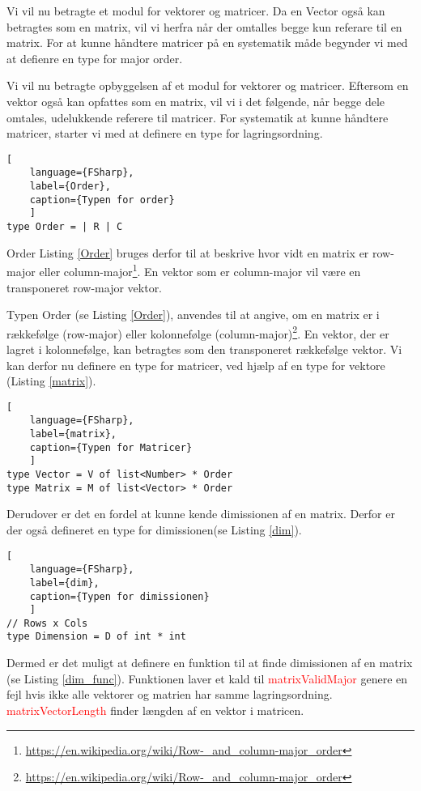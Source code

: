 Vi vil nu betragte et modul for vektorer og matricer. Da en Vector også kan betragtes som en matrix, vil vi herfra når der omtalles begge kun referare til en matrix. For at kunne håndtere matricer på en systematik måde begynder vi med at defienre en type for major order.

Vi vil nu betragte opbyggelsen af et modul for vektorer og matricer. Eftersom en vektor også kan opfattes som en matrix, vil vi i det følgende, når begge dele omtales, udelukkende referere til matricer. For systematik at kunne håndtere matricer, starter vi med at definere en type for lagringsordning.

\begin{lstlisting}[
    language={FSharp}, 
    label={Order}, 
    caption={Typen for order}
    ]
type Order = | R | C
\end{lstlisting}

Order Listing \ref{Order} bruges derfor til at beskrive hvor vidt en matrix er row-major eller column-major\footnote{\url{https://en.wikipedia.org/wiki/Row-_and_column-major_order}}. En vektor som er column-major vil være en transponeret row-major vektor.  

Typen Order (se Listing \ref{Order}), anvendes til at angive, om en matrix er i rækkefølge (row-major) eller kolonnefølge (column-major)\footnote{\url{https://en.wikipedia.org/wiki/Row-_and_column-major_order}}. En vektor, der er lagret i kolonnefølge, kan betragtes som den transponeret rækkefølge vektor. Vi kan derfor nu definere en type for matricer, ved hjælp af en type for vektore (Listing \ref{matrix}).

\begin{lstlisting}[
    language={FSharp}, 
    label={matrix}, 
    caption={Typen for Matricer}
    ]
type Vector = V of list<Number> * Order
type Matrix = M of list<Vector> * Order
\end{lstlisting}

Derudover er det en fordel at kunne kende dimissionen af en matrix. Derfor er der også defineret en type for dimissionen(se Listing \ref{dim}).

\begin{lstlisting}[
    language={FSharp}, 
    label={dim}, 
    caption={Typen for dimissionen}
    ]
// Rows x Cols
type Dimension = D of int * int
\end{lstlisting}

Dermed er det muligt at definere en funktion til at finde dimissionen af en matrix (se Listing \ref{dim_func}). Funktionen laver et kald til \textcolor{red}{matrixValidMajor} genere en fejl hvis ikke alle vektorer og matrien har samme lagringsordning. \textcolor{red}{matrixVectorLength} finder længden af en vektor i matricen.

